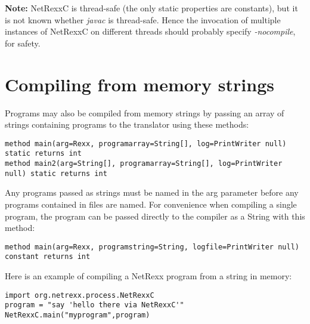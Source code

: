 \textbf{Note:} NetRexxC is thread-safe (the only static properties are constants), but
it is not known whether \emph{javac} is thread-safe.  Hence the
invocation of multiple instances of NetRexxC on different threads should
probably specify \emph{-nocompile}, for safety.

\section{Compiling from memory strings}
Programs may also be compiled from memory strings by passing an array
of strings containing programs to the translator using these methods:
\small
\begin{verbatim}
method main(arg=Rexx, programarray=String[], log=PrintWriter null) static returns int
method main2(arg=String[], programarray=String[], log=PrintWriter
null) static returns int
\end{verbatim}
\large
Any programs passed as strings must be named in the arg parameter before any programs contained in files are named.
For convenience when compiling a single program, the program can be
passed directly to the compiler as a String with this method:
\small
\begin{verbatim}
method main(arg=Rexx, programstring=String, logfile=PrintWriter null)
constant returns int
\end{verbatim}
\large
Here is an example of compiling a NetRexx program from a string in
memory:
\small
\begin{verbatim}
import org.netrexx.process.NetRexxC
program = "say 'hello there via NetRexxC'"
NetRexxC.main("myprogram",program)
\end{verbatim}
\large
